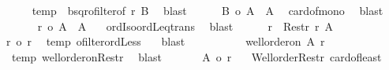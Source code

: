 \begin{isabellebody}
\ \ \ \ \isamarkupfalse%
\ temp{}\ {}\ bsqr{\isacharunderscore}{\kern0pt}ofilter{\isacharbrackleft}{\kern0pt}of\ r\ {\isacharquery}{\kern0pt}B{\isacharbrackright}{\kern0pt}\ \isamarkupfalse%
\ blast\isanewline
\ \ \ \ \isamarkupfalse%
\ {\isachardoublequoteopen}{\isacharbar}{\kern0pt}{\isacharquery}{\kern0pt}B{\isacharbar}{\kern0pt}\ {\isasymle}o\ {\isacharbar}{\kern0pt}A{}\ {\isasymtimes}\ A{}{\isacharbar}{\kern0pt}{\isachardoublequoteclose}\ \isamarkupfalse%
\ card{\isacharunderscore}{\kern0pt}of{\isacharunderscore}{\kern0pt}mono{}\ \isamarkupfalse%
\ blast\isanewline
\ \ \ \ \isamarkupfalse%
\ {}{}{\isacharcolon}{\kern0pt}\ {\isachardoublequoteopen}r\ {\isasymle}o\ {\isacharbar}{\kern0pt}A{}\ {\isasymtimes}\ A{}{\isacharbar}{\kern0pt}{\isachardoublequoteclose}\ \isamarkupfalse%
\ {}\ ordIso{\isacharunderscore}{\kern0pt}ordLeq{\isacharunderscore}{\kern0pt}trans\ \isamarkupfalse%
\ blast\isanewline
\ \ \ \ \isamarkupfalse%
\ {\isacharquery}{\kern0pt}r{}\ {\isacharequal}{\kern0pt}\ {\isachardoublequoteopen}Restr\ r\ A{}{\isachardoublequoteclose}\isanewline
\ \ \ \ \isamarkupfalse%
\ {\isachardoublequoteopen}{\isacharquery}{\kern0pt}r{}\ {\isacharless}{\kern0pt}o\ r{\isachardoublequoteclose}\ \isamarkupfalse%
\ temp{}\ ofilter{\isacharunderscore}{\kern0pt}ordLess\ {}\ \isamarkupfalse%
\ blast\isanewline
\ \ \ \ \isamarkupfalse%
\isanewline
\ \ \ \ \isacommand{{\isacharbraceleft}{\kern0pt}}\isamarkupfalse%
\isamarkupfalse%
\ {\isachardoublequoteopen}well{\isacharunderscore}{\kern0pt}order{\isacharunderscore}{\kern0pt}on\ A{}\ {\isacharquery}{\kern0pt}r{}{\isachardoublequoteclose}\ \isamarkupfalse%
\ {}\ temp{}\ well{\isacharunderscore}{\kern0pt}order{\isacharunderscore}{\kern0pt}on{\isacharunderscore}{\kern0pt}Restr\ \isamarkupfalse%
\ blast\isanewline
\ \ \ \ \ \isamarkupfalse%
\ {\isachardoublequoteopen}{\isacharbar}{\kern0pt}A{}{\isacharbar}{\kern0pt}\ {\isasymle}o\ {\isacharquery}{\kern0pt}r{}{\isachardoublequoteclose}\ \isamarkupfalse%
\ {}\ Well{\isacharunderscore}{\kern0pt}order{\isacharunderscore}{\kern0pt}Restr\ card{\isacharunderscore}{\kern0pt}of{\isacharunderscore}{\kern0pt}least\ \isamarkupfalse%

\end{isabellebody}
